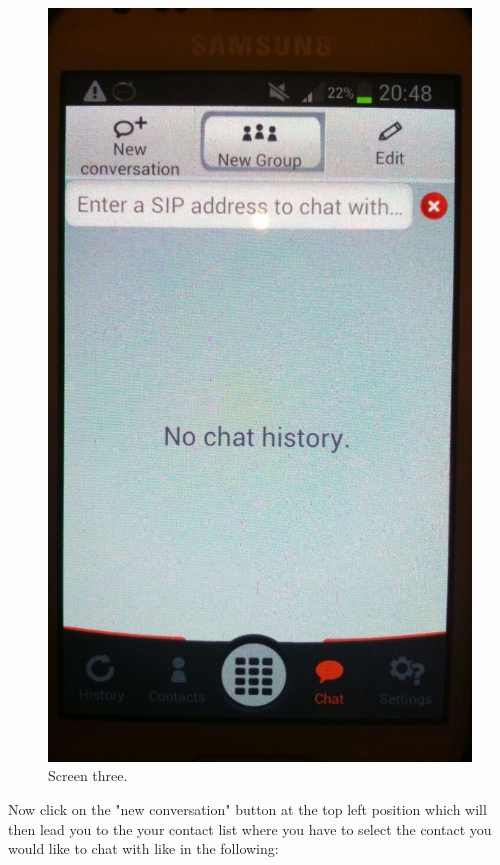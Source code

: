 \documentclass[a4paper]{article}
\begin{document}
\begin{center}
\begin{figure}[H]
\centering
\includegraphics[width=0.7\linewidth]{pictures/s1.jpg}
\caption{\label{fig:Screen3}Screen three.}
\end{figure}
\end{center}

Now click on the "new conversation" button at the top left position which will then lead you to the your contact list where you have to select the contact you would like to chat with like in the following:
\end{document}
